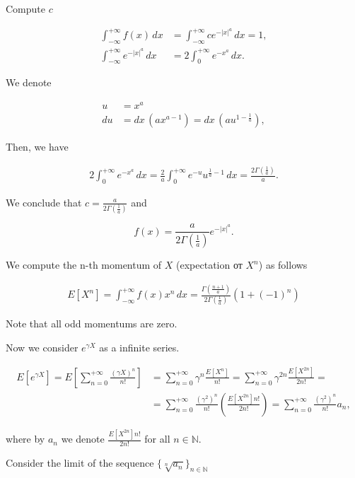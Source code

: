 \documentclass[12pt, a4paper]{article}
\theoremstyle{remark}
\newcommand{\expx}[1]{e^{-|x|^{#1}}}
\newcommand{\expxpoz}[1]{e^{-x^{#1}}}
\newcommand{\infint}[1]{\int_{-\infty}^{+\infty} #1 \, dx}
\newcommand{\infintpoz}[1]{\int_{0}^{+\infty} #1 \, dx}
\begin{document}
Compute $c$

\begin{align*}
    \infint{f(x)} & = \infint{c\expx{a}} = 1, \\
    \infint{\expx{a}} & = 2\infintpoz{\expxpoz{a}}.
\end{align*}

We denote

\begin{align*}
    u  & = x^a                                              \\
    du & = dx\,(a x^{a - 1}) = dx\,(a u^{1 - \frac{1}{a}}),
\end{align*}

Then, we have

\begin{align*}
    2\infintpoz{\expxpoz{a}} = \frac{2}{a} \infintpoz{e^{-u}u^{\frac{1}{a} - 1}} = \frac{2\Gamma(\frac{1}{a})}{a}.
\end{align*}

We conclude that $c = \frac{a}{2\Gamma(\frac{1}{a})}
$ and

$$f(x) = \frac{a}{2\Gamma(\frac{1}{a})} \expx{a}.$$

We compute the n-th momentum of $X$ (expectation от $X^n$) as follows

\begin{align*}
    E[X^n] = \infint{f(x) x^n} = \frac{\Gamma(\frac{n + 1}{a})}{2\Gamma(\frac{1}{a})} (1 + (-1)^n)
\end{align*}

Note that all odd momentums are zero. 

Now we consider $e^{\gamma X}$ as a infinite series.

\begin{align*}
    E[e^{\gamma X}] = E\left[\sum_{n = 0}^{+\infty}\frac{(\gamma X)^n}{n!}\right] & = \sum_{n = 0}^{+\infty}\gamma^n\frac{E[X^n]}{n!} = \sum_{n = 0}^{+\infty}\gamma^{2n}\frac{E[X^{2n}]}{2n!} =                                \\
    & = \sum_{n = 0}^{+\infty}\frac{(\gamma^2)^{n}}{n!}\left(\frac{E[X^{2n}]n!}{2n!}\right) = \sum_{n = 0}^{+\infty}\frac{(\gamma^2)^{n}}{n!} a_n,
\end{align*}

where by $a_n$ we denote $\frac{E[X^{2n}]n!}{2n!}$ for all $n \in \mathbb{N}$.

Consider the limit of the sequence $\{\sqrt[n]{a_n}\}_{n \in \mathbb{N}}$
\end{document}
